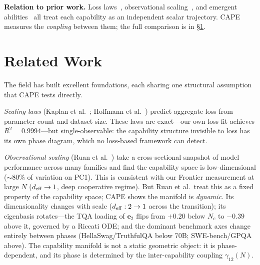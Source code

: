 \documentclass[11pt]{article}
\begin{document}
\textbf{Relation to prior work.}
Loss laws~\cite{kaplan2020,chinchilla2022}, observational scaling~\cite{ruan2024}, and emergent abilities~\cite{wei2022} all treat each capability as an independent scalar trajectory.
CAPE measures the \emph{coupling} between them; the full comparison is in \S\ref{sec:related}.

\begin{center}
\end{center}


\section{Related Work}
\label{sec:related}

The field has built excellent foundations, each sharing one structural assumption that CAPE tests directly.

\textit{Scaling laws} (Kaplan et al.~\cite{kaplan2020}; Hoffmann et al.~\cite{chinchilla2022}) predict aggregate loss from parameter count and dataset size.
These laws are exact---our own loss fit achieves $R^2=0.9994$---but single-observable: the capability structure invisible to loss has its own phase diagram, which no loss-based framework can detect.

\textit{Observational scaling} (Ruan et al.~\cite{ruan2024}) take a cross-sectional snapshot of model performance across many families and find the capability space is low-dimensional ($\sim$80\% of variation on PC1).
This is consistent with our Frontier measurement at large $N$ ($d_{\rm eff}\to 1$, deep cooperative regime).
But Ruan et al.\ treat this as a fixed property of the capability space; CAPE shows the manifold is \emph{dynamic}.
Its dimensionality changes with scale ($d_{\rm eff}: 2\to1$ across the transition); its eigenbasis rotates---the TQA loading of $\mathbf{e}_2$ flips from $+0.20$ below $N_c$ to $-0.39$ above it, governed by a Riccati ODE; and the dominant benchmark axes change entirely between phases (HellaSwag/TruthfulQA below 70B; SWE-bench/GPQA above).
The capability manifold is not a static geometric object: it is phase-dependent, and its phase is determined by the inter-capability coupling $\gamma_{12}(N)$.
\end{document}
